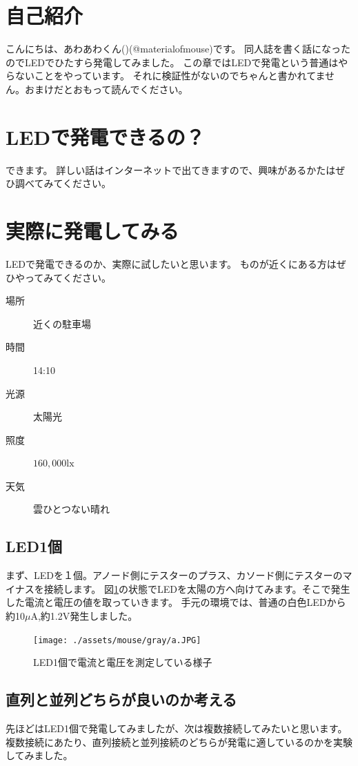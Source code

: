 \section{自己紹介}
こんにちは、あわあわくん()(@materialofmouse)です。
同人誌を書く話になったのでLEDでひたすら発電してみました。
この章ではLEDで発電という普通はやらないことをやっています。
それに検証性がないのでちゃんと書かれてません。おまけだとおもって読んでください。

\section{LEDで発電できるの？}
できます。
詳しい話はインターネットで出てきますので、興味があるかたはぜひ調べてみてください。


\section{実際に発電してみる}
LEDで発電できるのか、実際に試したいと思います。
ものが近くにある方はぜひやってみてください。

\begin{description}
  \item[場所]{近くの駐車場}
  \item[時間]{14:10}
  \item[光源]{太陽光}
  \item[照度]{$160,000\si\lux$}
  \item[天気]{雲ひとつない晴れ}
\end{description}


\subsection{LED1個}
まず、LEDを１個。アノード側にテスターのプラス、カソード側にテスターのマイナスを接続します。
図\ref{fig:led1}の状態でLEDを太陽の方へ向けてみます。そこで発生した電流と電圧の値を取っていきます。
手元の環境では、普通の白色LEDから約10$\mu\si\ampere$,約1.2$\si\volt$発生しました。

\begin{figure}[htbp]
    \centering
    \texttt{[image: ./assets/mouse/gray/a.JPG]}
    \caption{LED1個で電流と電圧を測定している様子}
    \label{fig:led1}
\end{figure}

\subsection{直列と並列どちらが良いのか考える}
先ほどはLED1個で発電してみましたが、次は複数接続してみたいと思います。
複数接続にあたり、直列接続と並列接続のどちらが発電に適しているのかを実験してみました。


